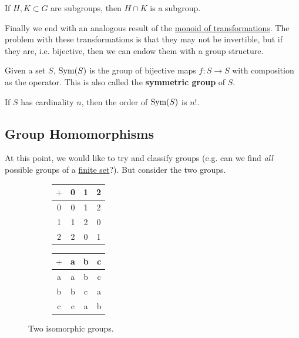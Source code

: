   \begin{theorem}
    \label{thm:intersection-of-subgroups}
    If $H, K \subset G$ are subgroups, then $H \cap K$ is a subgroup. 
  \end{theorem}

  Finally we end with an analogous result of the \hyperref[def:monoid-of-transformations]{monoid of transformations}. The problem with these transformations is that they may not be invertible, but if they are, i.e. bijective, then we can endow them with a group structure. 

  \begin{definition}
    \label{def:group-of-transformations}
    Given a set $S$, $\operatorname{Sym}(S)$ is the group of bijective maps $f: S \to S$ with composition as the operator. This is also called the \textbf{symmetric group} of $S$. 
  \end{definition}

  \begin{lemma}
    \label{thm:cardinality-of-group-of-transformations}
    If $S$ has cardinality $n$, then the order of $\operatorname{Sym}(S)$ is $n!$. 
  \end{lemma}

\subsection{Group Homomorphisms}

  At this point, we would like to try and classify groups (e.g. can we find \textit{all} possible groups of a \hyperref[st-def:finite-set]{finite set}?). But consider the two groups. 

  \begin{figure}[H]
    \centering
    \begin{subfigure}[b]{0.48\textwidth}
      \centering
      \begin{tabular}{c|ccc}
        \hline
        $+$ & 0 & 1 & 2 \\
        \hline
        0 & 0 & 1 & 2 \\
        1 & 1 & 2 & 0 \\
        2 & 2 & 0 & 1 \\
        \hline
      \end{tabular}
    \end{subfigure}
    \hfill 
    \begin{subfigure}[b]{0.48\textwidth}
      \centering
      \begin{tabular}{c|ccc}
        \hline
        $+$ & a & b & c \\
        \hline
        a & a & b & c \\
        b & b & c & a \\
        c & c & a & b \\
        \hline
      \end{tabular}
    \end{subfigure}
    \caption{Two isomorphic groups.}
  \end{figure} 

